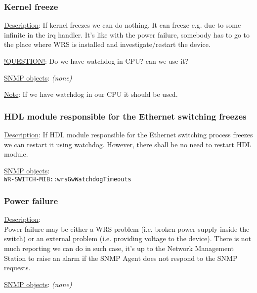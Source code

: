 \subsubsection{\bf Kernel freeze}
		\begin{packed_enum}
			\item [] \underline{Description}:
				If kernel freezes we can do nothing. It can freeze e.g. due to some
				infinite in the irq handler. It's like with the power failure, somebody
				has to go to the place where WRS is installed and investigate/restart
				the device.
			\item [] \underline{!QUESTION!}: Do we have watchdog in CPU? can we use it?
			\item [] \underline{SNMP objects}: \emph{(none)}
			\item [] \underline{Note}:
				If we have watchdog in our CPU it should be used.
		\end{packed_enum}

\subsubsection{\bf HDL module responsible for the Ethernet switching freezes}
		\label{fail:other:hdl_freeze}
		\begin{packed_enum}
			\item [] \underline{Description}:
				If HDL module responsible for the Ethernet
				switching process freezes we can restart it
				using watchdog. However, there shall be no need
				to restart HDL module.
			\item [] \underline{SNMP objects}: \\
				\texttt{WR-SWITCH-MIB::wrsGwWatchdogTimeouts}
		\end{packed_enum}

\subsubsection{\bf Power failure}
		\begin{packed_enum}
			\item [] \underline{Description}:\\
				Power failure may be either a WRS problem (i.e. broken power supply
				inside the switch) or an external problem (i.e. providing voltage to the
				device). There is not much reporting we can do in such case, it's up to
				the Network Management Station to raise an alarm if the SNMP Agent does
				not respond to the SNMP requests.
			\item [] \underline{SNMP objects}: \emph{(none)}
		\end{packed_enum}

